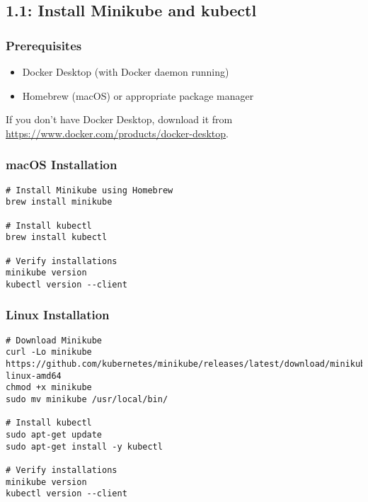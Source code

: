 \documentclass[12pt,a4paper]{article}
\begin{document}
\subsection{1.1: Install Minikube and kubectl}

\subsubsection{Prerequisites}

\begin{itemize}
    \item Docker Desktop (with Docker daemon running)
    \item Homebrew (macOS) or appropriate package manager
\end{itemize}

\begin{importantbox}
If you don't have Docker Desktop, download it from \url{https://www.docker.com/products/docker-desktop}.
\end{importantbox}

\subsubsection{macOS Installation}

\begin{lstlisting}[caption=Install Minikube and kubectl on macOS]
# Install Minikube using Homebrew
brew install minikube

# Install kubectl
brew install kubectl

# Verify installations
minikube version
kubectl version --client
\end{lstlisting}

\subsubsection{Linux Installation}

\begin{lstlisting}[caption=Install Minikube and kubectl on Linux]
# Download Minikube
curl -Lo minikube https://github.com/kubernetes/minikube/releases/latest/download/minikube-linux-amd64
chmod +x minikube
sudo mv minikube /usr/local/bin/

# Install kubectl
sudo apt-get update
sudo apt-get install -y kubectl

# Verify installations
minikube version
kubectl version --client
\end{lstlisting}
\end{document}
